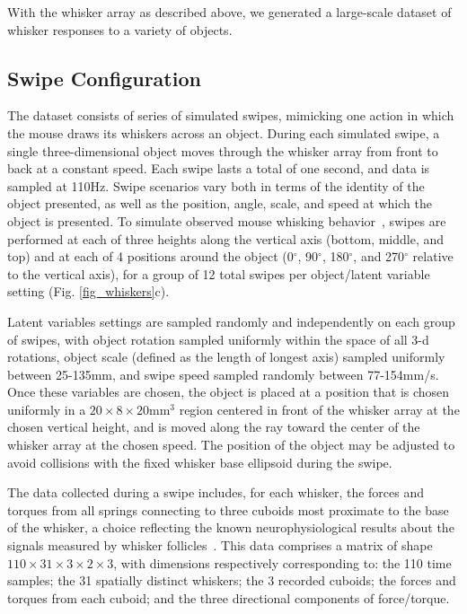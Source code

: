 With the whisker array as described above, we generated a large-scale dataset of whisker responses to a variety of objects.   

\subsection{Swipe Configuration}
The dataset consists of series of simulated swipes, mimicking one action in which the mouse draws its whiskers across an object.  
During each simulated swipe, a single three-dimensional object moves through the whisker array from front to back at a constant speed.  
Each swipe lasts a total of one second, and data is sampled at 110Hz. 
Swipe scenarios vary both in terms of the identity of the object presented, as well as the position, angle, scale, and speed at which the object is presented.  
To simulate observed mouse whisking behavior~\cite{hobbs2015spatiotemporal}, swipes are performed at each of three heights along the vertical axis (bottom, middle, and top) and at each of 4 positions around the object (0$^{\circ}$, 90$^{\circ}$, 180$^{\circ}$, and 270$^{\circ}$ relative to the vertical axis), for a group of 12 total swipes per object/latent variable setting (Fig. \ref{fig_whiskers}c). 

Latent variables settings are sampled randomly and independently on each group of swipes, with object rotation sampled uniformly within the space of all 3-d rotations, object scale (defined as the length of longest axis) sampled uniformly between 25-135mm, and swipe speed sampled randomly between 77-154mm/s.  
Once these variables are chosen, the object is placed at a position that is chosen uniformly in a  $20 \times 8 \times 20$mm$^{3}$ region centered in front of the whisker array at the chosen vertical height, and is moved along the ray toward the center of the whisker array at the chosen speed. 
The position of the object may be adjusted to avoid collisions with the fixed whisker base ellipsoid during the swipe. 

The data collected during a swipe includes, for each whisker, the forces and torques from all springs connecting to three cuboids most proximate to the base of the whisker, a choice reflecting the known neurophysiological results about the signals measured by whisker follicles~\cite{Quist2014, Huet2016}.  
This data comprises a matrix of shape $110 \times 31 \times 3 \times 2 \times 3$, with dimensions respectively corresponding to: the 110 time samples;  the 31 spatially distinct whiskers; the 3 recorded cuboids; the forces and torques from each cuboid; and the three directional components of force/torque.   


